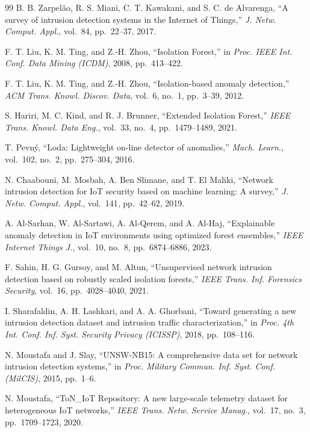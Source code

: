 \documentclass[journal]{IEEEtran}
\begin{document}
\begin{thebibliography}{99}
B. B. Zarpel\~{a}o, R. S. Miani, C. T. Kawakani, and S. C. de Alvarenga, ``A survey of intrusion detection systems in the Internet of Things,'' \textit{J. Netw. Comput. Appl.}, vol.~84, pp.~22--37, 2017.

F. T. Liu, K. M. Ting, and Z.-H. Zhou, ``Isolation Forest,'' in \textit{Proc. IEEE Int. Conf. Data Mining (ICDM)}, 2008, pp.~413--422.

F. T. Liu, K. M. Ting, and Z.-H. Zhou, ``Isolation-based anomaly detection,'' \textit{ACM Trans. Knowl. Discov. Data}, vol.~6, no.~1, pp.~3--39, 2012.

S. Hariri, M. C. Kind, and R. J. Brunner, ``Extended Isolation Forest,'' \textit{IEEE Trans. Knowl. Data Eng.}, vol.~33, no.~4, pp.~1479--1489, 2021.

T. Pevn\'{y}, ``Loda: Lightweight on-line detector of anomalies,'' \textit{Mach. Learn.}, vol.~102, no.~2, pp.~275--304, 2016.

N. Chaabouni, M. Mosbah, A. Ben Slimane, and T. El Maliki, ``Network intrusion detection for {IoT} security based on machine learning: A survey,'' \textit{J. Netw. Comput. Appl.}, vol.~141, pp.~42--62, 2019.

A. Al-Sarhan, W. Al-Sartawi, A. Al-Qerem, and A. Al-Haj, ``Explainable anomaly detection in {IoT} environments using optimized forest ensembles,'' \textit{IEEE Internet Things J.}, vol.~10, no.~8, pp.~6874--6886, 2023.

F. Sahin, H. G. Gursoy, and M. Altun, ``Unsupervised network intrusion detection based on robustly scaled isolation forests,'' \textit{IEEE Trans. Inf. Forensics Security}, vol.~16, pp.~4028--4040, 2021.

I. Sharafaldin, A. H. Lashkari, and A. A. Ghorbani, ``Toward generating a new intrusion detection dataset and intrusion traffic characterization,'' in \textit{Proc. 4th Int. Conf. Inf. Syst. Security Privacy (ICISSP)}, 2018, pp.~108--116.

N. Moustafa and J. Slay, ``{UNSW-NB15}: A comprehensive data set for network intrusion detection systems,'' in \textit{Proc. Military Commun. Inf. Syst. Conf. (MilCIS)}, 2015, pp.~1--6.

N. Moustafa, ``{ToN\_IoT} Repository: A new large-scale telemetry dataset for heterogeneous {IoT} networks,'' \textit{IEEE Trans. Netw. Service Manag.}, vol.~17, no.~3, pp.~1709--1723, 2020.


\end{thebibliography}
\end{document}
